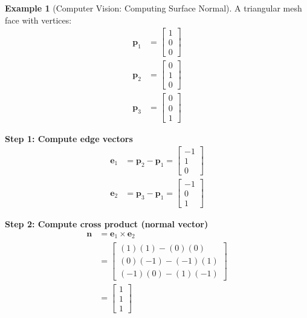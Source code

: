 \documentclass[12pt,a4paper]{article}
\theoremstyle{definition}
\newtheorem{example}{Example}[section]
\begin{document}
\begin{example}[Computer Vision: Computing Surface Normal]
A triangular mesh face with vertices:
\begin{align}
\mathbf{p}_1 &= \begin{bmatrix} 1 \\ 0 \\ 0 \end{bmatrix} \\
\mathbf{p}_2 &= \begin{bmatrix} 0 \\ 1 \\ 0 \end{bmatrix} \\
\mathbf{p}_3 &= \begin{bmatrix} 0 \\ 0 \\ 1 \end{bmatrix}
\end{align}

\textbf{Step 1: Compute edge vectors}
\begin{align}
\mathbf{e}_1 &= \mathbf{p}_2 - \mathbf{p}_1 = \begin{bmatrix} -1 \\ 1 \\ 0 \end{bmatrix} \\
\mathbf{e}_2 &= \mathbf{p}_3 - \mathbf{p}_1 = \begin{bmatrix} -1 \\ 0 \\ 1 \end{bmatrix}
\end{align}

\textbf{Step 2: Compute cross product (normal vector)}
\begin{align}
\mathbf{n} &= \mathbf{e}_1 \times \mathbf{e}_2 \\
&= \begin{bmatrix}
(1)(1) - (0)(0) \\
(0)(-1) - (-1)(1) \\
(-1)(0) - (1)(-1)
\end{bmatrix} \\
&= \begin{bmatrix}
1 \\
1 \\
1
\end{bmatrix}
\end{align}


\end{example}
\end{document}
